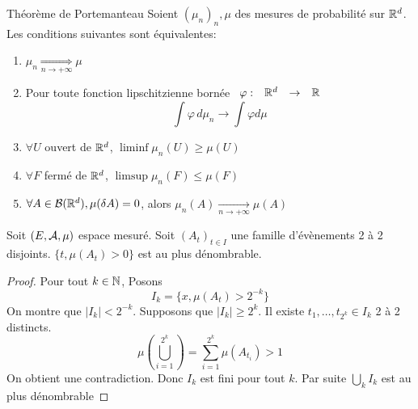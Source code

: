 \documentclass[]{report}
\begin{document}
    \begin{tm}{Théorème de Portemanteau}{}
        Soient $(\mu_n)_n,\mu$ des mesures de probabilité sur $\mathbb{R}^d$. Les conditions suivantes sont équivalentes:
        \begin{enumerate}
            \item $\mu_n\underset{n\to +\infty}{\Longrightarrow}\mu$
            \item Pour toute fonction lipschitzienne bornée $\begin{array}{ccccc} \varphi : & \mathbb{R}^d & \to & \mathbb{R} \end{array}$
            \[\int \varphi \,d\mu_n\to \int \varphi d\mu\]
            \item $\forall U$ ouvert de $\mathbb{R}^d$, $\liminf \mu_n(U)\ge \mu(U)$
            \item $\forall F$ fermé de $\mathbb{R}^d$, $\limsup \mu_n(F)\le \mu(F)$
            \item $\forall A\in \mathcal{B}(\mathbb{R}^d),\mu(\delta A)=0$, alors $\mu_n(A)\underset{n\to +\infty}{\longrightarrow} \mu(A)$
        \end{enumerate}
    \end{tm}

    \begin{lm}{}{}
        Soit $(E,\mathcal{A},\mu)$ espace mesuré. Soit $(A_t)_{t\in I}$ une famille d'évènements 2 à 2 disjoints. $\{t,\mu(A_t)>0\}$ est au plus dénombrable.
    \end{lm}

    \begin{proof}
        Pour tout $k\in \mathbb{N}$, Posons
        \[I_k=\{x,\mu\left(A_t\right)>2^{-k}\}\]
        On montre que $|I_k|<2^{-k}$. Supposons que $|I_k|\ge 2^{k}$. Il existe $t_1,\ldots,t_{2^k}\in I_k$ 2 à 2 distincts.
        \[\mu\left(\bigcup_{i=1}^{2^k}\right)=\sum_{i=1}^{2^k}\mu(A_{t_i})>1\]
        On obtient une contradiction. Donc $I_k$ est fini pour tout $k$. Par suite $\bigcup_k I_k$ est au plus dénombrable
    \end{proof}
\end{document}
